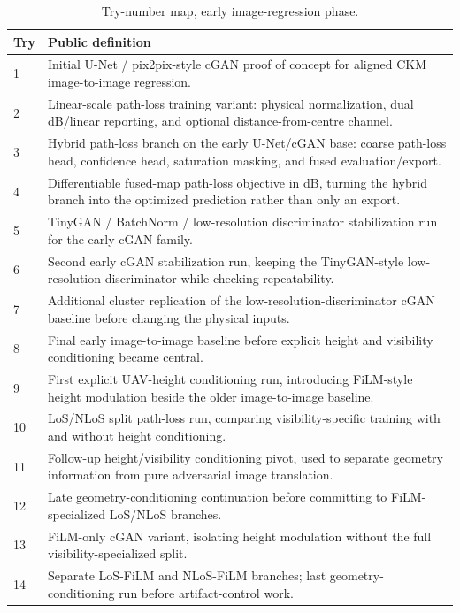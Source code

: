 \begin{table}[H]
\centering
\caption{Try-number map, early image-regression phase.}
\label{tab:try_map_early}
\scriptsize
\renewcommand{\arraystretch}{1.06}
\begin{tabularx}{\textwidth}{p{}>{\raggedright\arraybackslash}X}
\toprule
Try & Public definition \\
\midrule
1 & Initial U-Net / pix2pix-style cGAN proof of concept for aligned CKM image-to-image regression. \\
2 & Linear-scale path-loss training variant: physical normalization, dual dB/linear reporting, and optional distance-from-centre channel. \\
3 & Hybrid path-loss branch on the early U-Net/cGAN base: coarse path-loss head, confidence head, saturation masking, and fused evaluation/export. \\
4 & Differentiable fused-map path-loss objective in dB, turning the hybrid branch into the optimized prediction rather than only an export. \\
5 & TinyGAN / BatchNorm / low-resolution discriminator stabilization run for the early cGAN family. \\
6 & Second early cGAN stabilization run, keeping the TinyGAN-style low-resolution discriminator while checking repeatability. \\
7 & Additional cluster replication of the low-resolution-discriminator cGAN baseline before changing the physical inputs. \\
8 & Final early image-to-image baseline before explicit height and visibility conditioning became central. \\
9 & First explicit UAV-height conditioning run, introducing FiLM-style height modulation beside the older image-to-image baseline. \\
10 & LoS/NLoS split path-loss run, comparing visibility-specific training with and without height conditioning. \\
11 & Follow-up height/visibility conditioning pivot, used to separate geometry information from pure adversarial image translation. \\
12 & Late geometry-conditioning continuation before committing to FiLM-specialized LoS/NLoS branches. \\
13 & FiLM-only cGAN variant, isolating height modulation without the full visibility-specialized split. \\
14 & Separate LoS-FiLM and NLoS-FiLM branches; last geometry-conditioning run before artifact-control work. \\

\end{tabularx}
\end{table}

